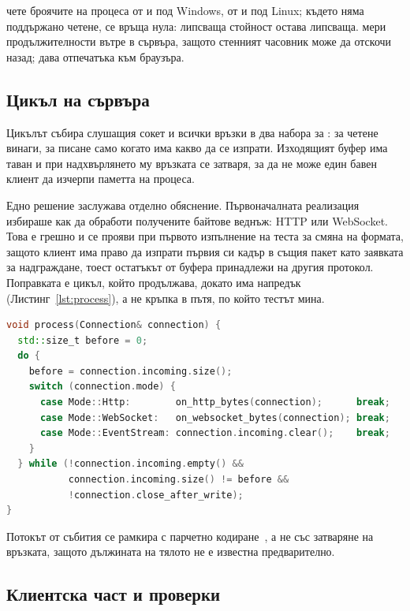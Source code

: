  чете броячите на процеса от  и
 под Windows, от  и  под
Linux; където няма поддържано четене, се връща нула: липсваща стойност остава липсваща.
 мери продължителности вътре в сървъра, защото стенният часовник може да
отскочи назад;  дава отпечатъка към браузъра.

\subsection{Цикъл на сървъра}

Цикълът събира слушащия сокет и всички връзки в два набора за : за четене винаги,
за писане само когато има какво да се изпрати. Изходящият буфер има таван и при надхвърлянето
му връзката се затваря, за да не може един бавен клиент да изчерпи паметта на процеса.

Едно решение заслужава отделно обяснение. Първоначалната реализация избираше как да обработи
получените байтове веднъж: HTTP или WebSocket. Това е грешно и се прояви при първото изпълнение
на теста за смяна на формата, защото клиент има право да изпрати първия си кадър в същия пакет
като заявката за надграждане, тоест остатъкът от буфера принадлежи на другия протокол.
Поправката е цикъл, който продължава, докато има напредък (Листинг~\ref{lst:process}), а не
кръпка в пътя, по който тестът мина.

\begin{lstlisting}[language=C++, aboveskip=0.6em, belowskip=0.6em,
                   caption={Обработка на получените байтове според режима,
                   \code{src/server.cpp}}, label={lst:process}]
void process(Connection& connection) {
  std::size_t before = 0;
  do {
    before = connection.incoming.size();
    switch (connection.mode) {
      case Mode::Http:        on_http_bytes(connection);      break;
      case Mode::WebSocket:   on_websocket_bytes(connection); break;
      case Mode::EventStream: connection.incoming.clear();    break;
    }
  } while (!connection.incoming.empty() &&
           connection.incoming.size() != before &&
           !connection.close_after_write);
}
\end{lstlisting}

Потокът от събития се рамкира с парчетно кодиране~\cite{rfc9112}, а не със затваряне на
връзката, защото дължината на тялото не е известна предварително.

\subsection{Клиентска част и проверки}

